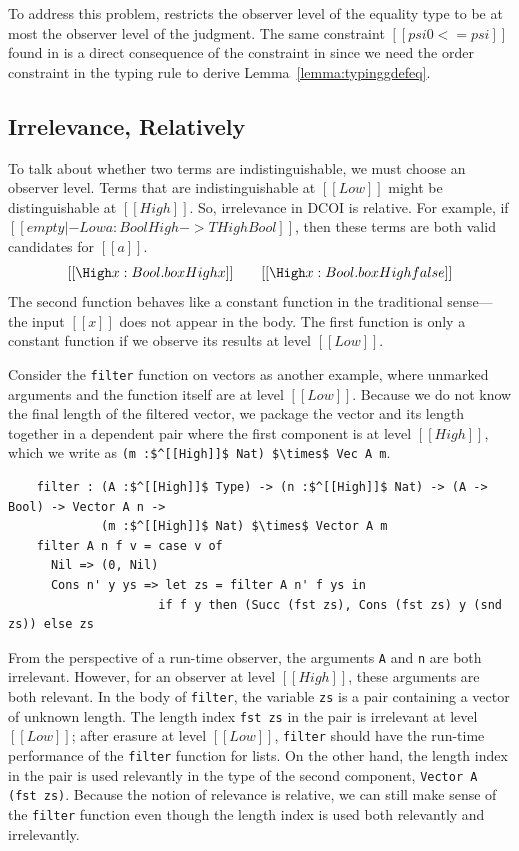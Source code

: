 \documentclass[acmsmall]{acmart}
\def\lstinlinecol{\lstinline[columns=fullflexible]}
\newcommand{\name}{DCOI\xspace}
\begin{document}
To address this problem,  restricts the observer level of
the equality type to be at most the observer level of the
judgment.
The same constraint $[[psi0 <= psi]]$ found in
 is a direct consequence of the constraint in
 since we need the order constraint in the typing rule to
derive Lemma~\ref{lemma:typinggdefeq}.

\subsection{Irrelevance, Relatively}
\label{sec:irrelrel}
To talk about whether two
terms are indistinguishable, we must choose an observer level.
Terms that are indistinguishable at $[[Low]]$ might be
distinguishable at $[[High]]$.
So, irrelevance in \name{} is
relative. For example, if $[[empty |- Low a : Bool High -> T High Bool]]$, then these terms are both valid candidates for $[[a]]$.
\[ [[\High x : Bool . box High x]]  \qquad
  [[\High x : Bool . box High false]] \]
The second function behaves like a constant function in
the traditional sense---the input $[[x]]$ does not appear
in the body. The first function is only a
constant function if we observe its results at level $[[Low]]$.

Consider the \lstinlinecol{filter} function on vectors as another example,
where unmarked arguments and the function itself are at level $[[Low]]$.
Because we do not know the final length of the filtered vector,
we package the vector and its length together in a dependent pair
where the first component is at level $[[High]]$,
which we write as \lstinline{(m :$^[[High]]$ Nat) $\times$ Vec A m}.

\begin{lstlisting}
    filter : (A :$^[[High]]$ Type) -> (n :$^[[High]]$ Nat) -> (A -> Bool) -> Vector A n ->
             (m :$^[[High]]$ Nat) $\times$ Vector A m
    filter A n f v = case v of
      Nil => (0, Nil)
      Cons n' y ys => let zs = filter A n' f ys in
                     if f y then (Succ (fst zs), Cons (fst zs) y (snd zs)) else zs
\end{lstlisting}

From the perspective of a run-time observer,
the arguments \lstinline{A} and \lstinline{n} are both irrelevant.
However, for an observer at level $[[High]]$, these arguments are both relevant.
In the body of \lstinlinecol{filter},
the variable \lstinline{zs} is a pair containing a
vector of unknown length. The length index \lstinline{fst zs} in the
pair is irrelevant at level $[[Low]]$; after erasure at
level $[[Low]]$,
\lstinlinecol{filter} should have the run-time performance of the
\lstinlinecol{filter} function for lists.
On the other hand, the length index in the pair is used relevantly
in the type of the second component, \lstinline{Vector A (fst zs)}.
Because the notion of relevance is relative, we
can still make sense of the \lstinlinecol{filter} function even though
the length index is used both relevantly and irrelevantly.
\end{document}
